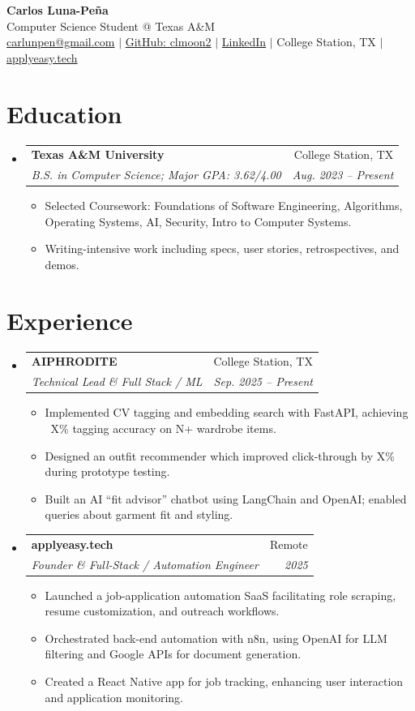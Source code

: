 \documentclass[letterpaper,11pt]{article}
\makeatletter
\newcommand{\resumeItem}[1]{
  \item\small{{#1 \vspace{-2pt}}}
}
\newcommand{\resumeSubheading}[4]{
  \vspace{-2pt}\item
  \begin{tabular*}{0.97\textwidth}[t]{l@{\extracolsep{\fill}}r}
    \textbf{#1} & #2 \\
    \textit{\small#3} & \textit{\small #4} \\
  \end{tabular*}\vspace{-7pt}
}
\newcommand{\resumeSubHeadingListStart}{\begin{itemize}[leftmargin=0.15in, label={}]}
\newcommand{\resumeSubHeadingListEnd}{\end{itemize}}
\newcommand{\resumeItemListStart}{\begin{itemize}}
\newcommand{\resumeItemListEnd}{\end{itemize}\vspace{-5pt}}
\makeatother
\begin{document}
\begin{center}
    \textbf{\Huge Carlos Luna-Peña} \\
    \vspace{2pt}
    Computer Science Student @ Texas A\&M \\
    \vspace{2pt}
    \href{mailto:carlunpen@gmail.com}{carlunpen@gmail.com} $|$ 
    \href{https://github.com/clmoon2}{GitHub: clmoon2} $|$
    \href{https://linkedin.com/in/carlos-luna}{LinkedIn} $|$
    College Station, TX $|$ \href{https://applyeasy.tech}{applyeasy.tech}
\end{center}

\vspace{-10pt}
\section{Education}
\resumeSubHeadingListStart
\resumeSubheading
{Texas A\&M University}{College Station, TX}
{B.S. in Computer Science; Major GPA: 3.62/4.00}{Aug. 2023 -- Present}
\vspace{-5pt}
\resumeItemListStart
\resumeItem{Selected Coursework: Foundations of Software Engineering, Algorithms, Operating Systems, AI, Security, Intro to Computer Systems.}
\resumeItem{Writing-intensive work including specs, user stories, retrospectives, and demos.}
\resumeItemListEnd
\resumeSubHeadingListEnd

\vspace{-6pt}
\section{Experience}
\resumeSubHeadingListStart
\resumeSubheading
{AIPHRODITE}{College Station, TX}
{Technical Lead \& Full Stack / ML}{Sep. 2025 -- Present}
\resumeItemListStart
\resumeItem{Implemented CV tagging and embedding search with FastAPI, achieving ~{X}\% tagging accuracy on {N}+ wardrobe items.}
\resumeItem{Designed an outfit recommender which improved click-through by {X}\% during prototype testing.}
\resumeItem{Built an AI “fit advisor” chatbot using LangChain and OpenAI; enabled queries about garment fit and styling.}
\resumeItemListEnd

\resumeSubheading
{applyeasy.tech}{Remote}
{Founder \& Full-Stack / Automation Engineer}{2025}
\resumeItemListStart
\resumeItem{Launched a job-application automation SaaS facilitating role scraping, resume customization, and outreach workflows.}
\resumeItem{Orchestrated back-end automation with n8n, using OpenAI for LLM filtering and Google APIs for document generation.}
\resumeItem{Created a React Native app for job tracking, enhancing user interaction and application monitoring.}
\resumeItemListEnd
\resumeSubHeadingListEnd
\end{document}
